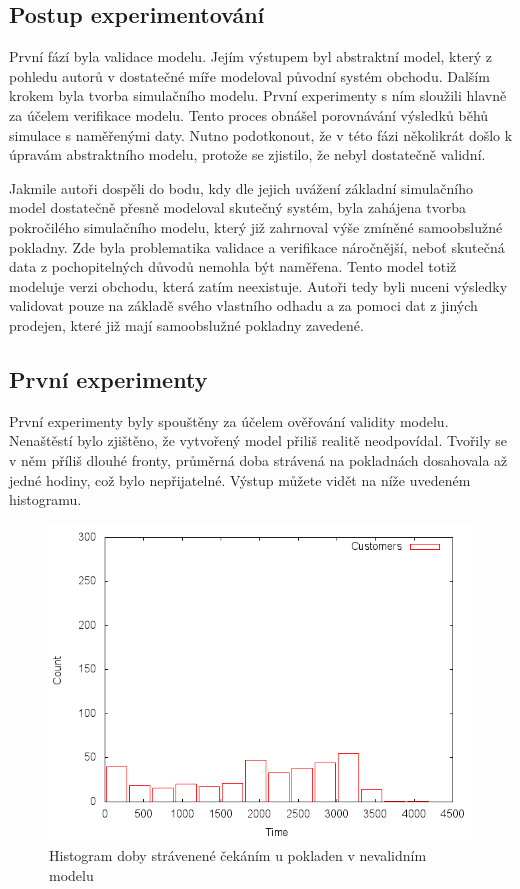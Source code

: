 \documentclass[12pt,a4paper,titlepage]{article}
\begin{document}
\subsection{Postup experimentování}
První fází byla validace modelu. Jejím výstupem byl abstraktní model, který z pohledu autorů v dostatečné míře modeloval původní systém obchodu. Dalším krokem byla tvorba simulačního modelu. První experimenty s ním sloužili hlavně za účelem verifikace modelu. Tento proces obnášel porovnávání výsledků běhů simulace s naměřenými daty. Nutno podotkonout, že v této fázi několikrát došlo k úpravám abstraktního modelu, protože se zjistilo, že nebyl dostatečně validní. 

Jakmile autoři dospěli do bodu, kdy dle jejich uvážení základní simulačního model dostatečně přesně modeloval skutečný systém, byla zahájena tvorba pokročilého simulačního modelu, který již zahrnoval výše zmíněné samoobslužné pokladny. Zde byla problematika validace a verifikace náročnější, neboť skutečná data z pochopitelných důvodů nemohla být naměřena. Tento model totiž modeluje verzi obchodu, která zatím neexistuje. Autoři tedy byli nuceni výsledky validovat pouze na základě svého vlastního odhadu a za pomoci dat z jiných prodejen, které již mají samoobslužné pokladny zavedené.

\subsection{První experimenty}
První experimenty byly spouštěny za účelem ověřování validity modelu. Nenaštěstí bylo zjištěno, že vytvořený model přiliš realitě neodpovídal. Tvořily se v něm příliš dlouhé fronty, průměrná doba strávená na pokladnách dosahovala až jedné hodiny, což bylo nepřijatelné. Výstup můžete vidět na níže uvedeném histogramu. 

\begin{figure}[h]
\centering
\includegraphics[scale=0.75]{awful}
\caption{Histogram doby strávenené čekáním u pokladen v nevalidním modelu}
\end{figure}
\end{document}
